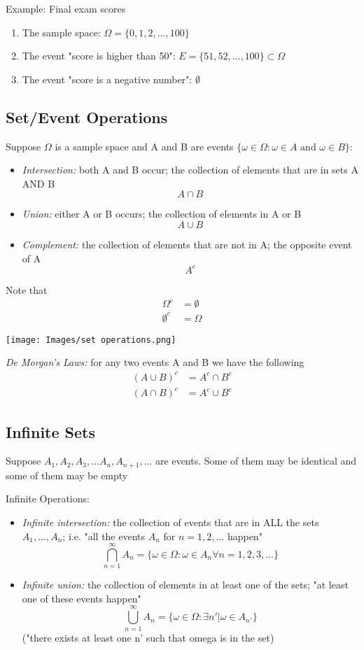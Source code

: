 \documentclass[12pt]{article}
\begin{document}
Example: Final exam scores
\begin{enumerate}
    \item The sample space: $\Omega = \{0, 1, 2, ..., 100\}$
    \item The event "score is higher than 50": $E = \{51, 52, ..., 100\} \subset \Omega$
    \item The event "score is a negative number": $\emptyset$ 
\end{enumerate}

\subsection*{Set/Event Operations}
Suppose $\Omega$ is a sample space and A and B are events $\{\omega \in \Omega : \omega \in A \text{ and } \omega \in B\}$:
\begin{itemize}
    \item \emph{Intersection:} both A and B occur; the collection of elements that are in sets A AND B 
    \[A \cap B \]
    \item \emph{Union:} either A or B occurs; the collection of elements in A or B
    \[A \cup  B\]
    \item \emph{Complement:} the collection of elements that are not in A; the opposite event of A 
    \[A^c\]
\end{itemize}
Note that 
\begin{align*}
    \Omega^c &= \emptyset\\
    \emptyset^c &= \Omega
\end{align*}
\begin{center}
    \texttt{[image: Images/set operations.png]}
\end{center}

\emph{De Morgan's Laws:} for any two events A and B we have the following
\begin{align}
    (A \cup B)^c &= A^c \cap B^c\\
    (A \cap B)^c &= A^c \cup B^c
\end{align}

\subsection*{Infinite Sets}
Suppose $A_1, A_2, A_3, ... A_n, A_{n + 1}, ...$ are events. Some of them may be identical and some of them may be empty

Infinite Operations:
\begin{itemize}
    \item \emph{Infinite intersection:} the collection of events that are in ALL the sets $A_1, ..., A_n$; i.e. "all the events $A_n$ for $n = 1, 2, ...$ happen"
    \[\bigcap_{n=1}^\infty A_n = \{\omega \in \Omega : \omega \in A_n \forall n = 1, 2, 3, ...\}\]
    
    \item \emph{Infinite union:} the collection of elements in at least one of the sets; "at least one of these events happen"
    \[\bigcup_{n=1}^\infty A_n = \{\omega \in \Omega : \exists n' | \omega \in A_{n'}\}\]
    ("there exists at least one n' such that omega is in the set)
\end{itemize}
\end{document}
